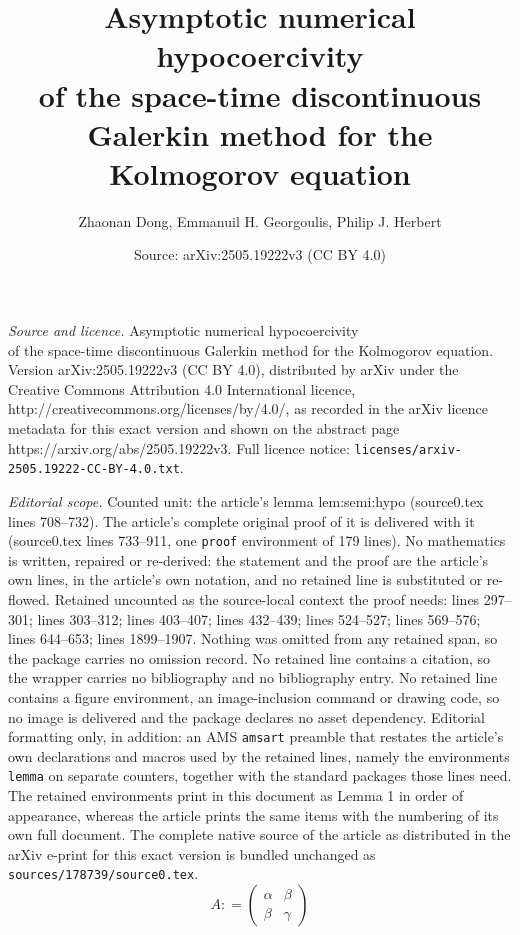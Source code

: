 \documentclass[10pt,a4paper]{amsart}
\title{Asymptotic numerical hypocoercivity \\ of the space-time discontinuous Galerkin method for {the} Kolmogorov equation}
\author{Zhaonan Dong, Emmanuil H. Georgoulis, Philip J. Herbert}
\date{Source: arXiv:2505.19222v3 (CC BY 4.0)}
\begin{document}
\maketitle

\noindent\emph{Source and licence.} Asymptotic numerical hypocoercivity \\ of the space-time discontinuous Galerkin method for {the} Kolmogorov equation. Version arXiv:2505.19222v3 (CC BY 4.0), distributed by arXiv under the Creative Commons Attribution 4.0 International licence, http://creativecommons.org/licenses/by/4.0/, as recorded in the arXiv licence metadata for this exact version and shown on the abstract page https://arxiv.org/abs/2505.19222v3. Full licence notice: \texttt{licenses/arxiv-2505.19222-CC-BY-4.0.txt}.\par\smallskip

\noindent\textit{Editorial scope.} Counted unit: the article's lemma lem:semi:hypo (source0.tex lines 708--732). The article's complete original proof of it is delivered with it (source0.tex lines 733--911, one \texttt{proof} environment of 179 lines). No mathematics is written, repaired or re-derived: the statement and the proof are the article's own lines, in the article's own notation, and no retained line is substituted or re-flowed.  Retained uncounted as the source-local context the proof needs: lines 297--301; lines 303--312; lines 403--407; lines 432--439; lines 524--527; lines 569--576; lines 644--653; lines 1899--1907.  Nothing was omitted from any retained span, so the package carries no omission record.  No retained line contains a citation, so the wrapper carries no bibliography and no bibliography entry.  No retained line contains a figure environment, an image-inclusion command or drawing code, so no image is delivered and the package declares no asset dependency.  Editorial formatting only, in addition: an AMS \texttt{amsart} preamble that restates the article's own declarations and macros used by the retained lines, namely the environments \texttt{lemma} on separate counters, together with the standard packages those lines need.  The retained environments print in this document as Lemma 1 in order of appearance, whereas the article prints the same items with the numbering of its own full document.  The complete native source of the article as distributed in the arXiv e-print for this exact version is bundled unchanged as \texttt{sources/178739/source0.tex}.
\begin{equation}\label{eq:A_def}
 A : =      \begin{pmatrix}
     \alpha & \beta \\ \beta & \gamma
    \end{pmatrix}
\end{equation}
\end{document}
